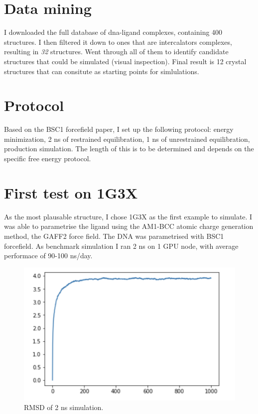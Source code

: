 \documentclass{article}
\begin{document}
\section{Data mining}

I downloaded the full database of dna-ligand complexes, containing 400 structures. I then filtered it down to ones that are intercalators complexes, resulting in \emph{32} structures. Went through all of them to identify candidate structures that could be simulated (visual inspection). Final result is 12 crystal structures that can consitute as starting points for simlulations.

\section{Protocol}

Based on the BSC1 forcefield paper, I set up the following protocol: energy minimization, 2 ns of restrained equilibration, 1 ns of unrestrained equilibration, production simulation. The length of this is to be determined and depends on the specific free energy protocol.

\section{First test on 1G3X}

As the most plausable structure, I chose 1G3X as the first example to simulate. I was able to parametrise the ligand using the AM1-BCC atomic charge generation method, the GAFF2 force field. The DNA was parametrised with BSC1 forcefield. As benchmark simulation I ran 2 ns on 1 GPU node, with average performace of 90-100 ns/day.

\begin{figure}
  \includegraphics{rmsd}
  \caption{RMSD of 2 ns simulation.}
  \label{f1}
\end{figure}
\end{document}
